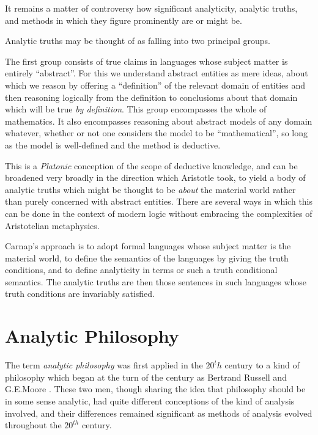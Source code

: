 It remains a matter of controversy how significant analyticity,
analytic truths, and methods in which they figure prominently are or
might be.

Analytic truths may be thought of as falling into two principal
groups.

The first group consists of true claims in languages whose subject
matter is entirely ``abstract''.
For this we understand abstract entities as mere ideas, about which we
reason by offering a ``definition'' of the relevant domain of entities
and then reasoning logically from the definition to conclusioms about
that domain which will be true \emph{by definition}.
This group encompasses the whole of mathematics.
It also encompasses reasoning about abstract models of any domain
whatever, whether or not one considers the model to be
``mathematical'', so long as the model is well-defined and the method
is deductive.

This is a \emph{Platonic} conception of the scope of deductive
knowledge, and can be broadened very broadly in the direction which
Aristotle took, to yield a body of analytic truths which might be
thought to be \emph{about} the material world rather than purely
concerned with abstract entities.
There are several ways in which this can be done in the context of
modern logic without embracing the complexities of Aristotelian
metaphysics.

Carnap's approach is to adopt formal languages whose subject matter is
the material world, to define the semantics of the languages by giving
the truth conditions, and to define analyticity in terms or such a
truth conditional semantics.
The analytic truths are then those sentences in such languages whose
truth conditions are invariably satisfied.

\section{Analytic Philosophy}

The term \emph{analytic philosophy} was first applied in the $20^th$
century to a kind of philosophy which began at the turn of the century
as Bertrand Russell  and G.E.Moore
.
These two men, though sharing the idea that philosophy should be in
some sense analytic, had quite different conceptions of the kind of
analysis involved, and their differences remained significant as
methods of analysis evolved throughout the $20^{th}$ century.


